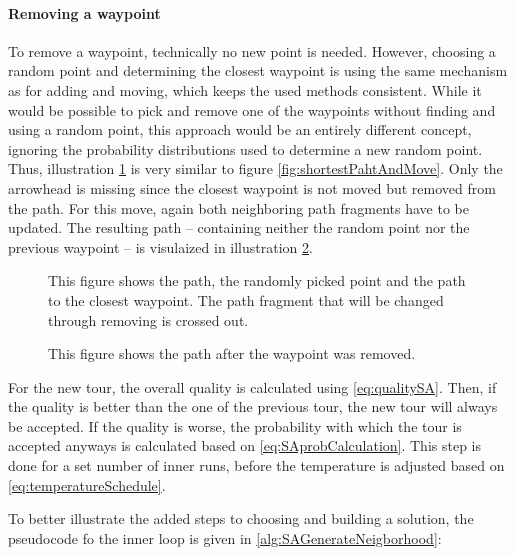 \paragraph{Removing a waypoint}
To remove a waypoint, technically no new point is needed. 
However, choosing a random point and determining the closest waypoint is using the same mechanism as for adding and moving, which keeps the used methods consistent.
While it would be possible to pick and remove one of the waypoints without finding and using a random point, this approach would be an entirely different concept, ignoring the probability distributions used to determine a new random point.
Thus, illustration \ref{fig:shortestPahtAndRemove} is very similar to figure \ref{fig:shortestPahtAndMove}.
Only the arrowhead is missing since the closest waypoint is not moved but removed from the path.
For this move, again both neighboring path fragments have to be updated.
The resulting path -- containing neither the random point nor the previous waypoint -- is visulaized in illustration \ref{fig:shortestPathAndRemoveDone}.


	\begin{figure}[H]
		\centering
		
		\caption{This figure shows the path, the randomly picked point and the path to the closest waypoint.
		The path fragment that will be changed through removing is crossed out.}
		\label{fig:shortestPahtAndRemove}
	\end{figure}
	\begin{figure}[H]
		\centering
		
		\caption{This figure shows the path after the waypoint was removed.}
		\label{fig:shortestPathAndRemoveDone}
	\end{figure}





For the new tour, the overall quality is calculated using \ref{eq:qualitySA}. 
Then, if the quality is better than the one of the previous tour, the new tour will always be accepted.
If the quality is worse, the probability with which the tour is accepted anyways is calculated based on \ref{eq:SAprobCalculation}. 
This step is done for a set number of inner runs, before the temperature is adjusted based on \ref{eq:temperatureSchedule}.




To better illustrate the added steps to choosing and building a solution, the pseudocode fo the inner loop is given in \ref{alg:SAGenerateNeigborhood}:



